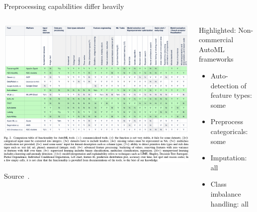 	\begin{frame}{Preprocessing capabilities differ heavily}
		\begin{columns}
			\begin{column}{0.6\textwidth}
				\vspace*{-1cm}
				\begin{center}
					\includegraphics[width = \linewidth]{images/Truong2019Towards_fig2.pdf}
				\end{center}
				\vspace{-1em}
				{\tiny Source~.}
			
			\end{column}%
			\begin{column}{0.4\textwidth}
				\small
				
				\vspace{1em}
				
				Highlighted: Non-commercial AutoML frameworks
				
				\begin{itemize}
					\item Auto-detection of feature types: some
					\item Preprocess categoricals: some
					\item Imputation: all
					\item Class imbalance handling: all
				\end{itemize}
			\end{column}
		\end{columns}
	\end{frame}
	
